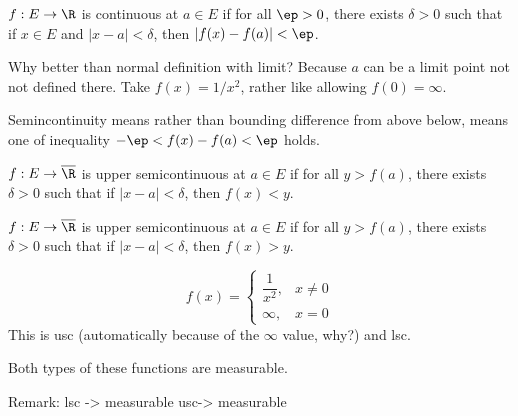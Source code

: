 




\begin{dfn}
$f: E \to \R$ is continuous at $a \in E$ if for all $\ep>0$, there exists $\delta>0$ such that if $x \in E$ and $|x-a|<\delta$, then $|f(x)-f(a)|<\ep$.
\end{dfn}

Why better than normal definition with limit? Because $a$ can be a limit point not not defined there. Take $f(x)=1/x^2$, rather like allowing $f(0)=\infty$. 


Semincontinuity means rather than bounding difference from above below, means one of inequality $-\ep<f(x)-f(a)<\ep$ holds. 




\begin{dfn}
$f: E \to \overline{\R}$ is upper semicontinuous at $a \in E$ if for all $y>f(a)$, there exists $\delta>0$ such that if $|x-a|<\delta$, then $f(x)<y$. 
\end{dfn}




\begin{dfn}
$f: E \to \overline{\R}$ is upper semicontinuous at $a \in E$ if for all $y>f(a)$, there exists $\delta>0$ such that if $|x-a|<\delta$, then $f(x)>y$. 
\end{dfn}

\begin{ex}
	\[
	f(x)=
	\begin{cases}
	\dfrac{1}{x^2}, & x \neq 0 \\
	\infty, & x=0
	\end{cases}
	\]
This is usc (automatically because of the $\infty$ value, why?) and lsc. 
\end{ex}

Both types of these functions are measurable. 



Remark: lsc -> measurable
usc-> measurable

